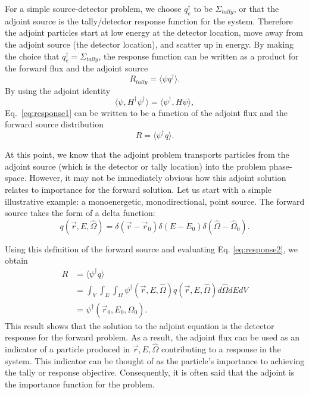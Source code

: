 For a simple source-detector problem, we choose
$q_{e}^{\dagger}$ to be $\Sigma_{tally}$, or that the adjoint source is the
tally/detector response function
for the system. Therefore the adjoint particles start at low energy at the detector
location, move away from the adjoint source (the detector location), and scatter
up in energy.
 By making the choice that $q_{e}^{\dagger} = \Sigma_{tally}$, the
response function can be written as a product for the forward flux and the
adjoint source
\begin{equation}
  R_{tally} = \langle \psi q^{\dagger} \rangle .
  \label{eq:response1}
\end{equation}
By using the adjoint identity 
\begin{equation}
  \langle \psi, H^{\dagger} \psi^{\dagger} \rangle =
  \langle \psi^{\dagger}, H \psi \rangle ,
\end{equation}
Eq.\ \eqref{eq:response1} can be written to be a function of the
adjoint flux and the forward source distribution
\begin{equation}
  R = \langle \psi^{\dagger} q \rangle .
  \label{eq:response2}
\end{equation}

At this point, we know that the adjoint problem transports particles from the adjoint source (which is the detector or tally
location) into the problem phase-space. However, it may not be immediately obvious how this adjoint solution
relates to importance for the forward solution. Let us start with a simple
illustrative example: a monoenergetic, monodirectional, point source. The
forward source takes the form of a delta function:
\begin{equation*}
  q(\vec{r}, E, \hat{\Omega}) = \delta(\vec{r}-\vec{r}_0) \delta(E-E_0)
  \delta(\hat{\Omega}-\hat{\Omega}_0) .
\end{equation*}

Using this definition of the forward source and evaluating Eq.
\eqref{eq:response2}, we obtain
\begin{equation*}
  \begin{split}
    R &= \langle \psi^{\dagger} q \rangle \\
    &= \int_{V} \int_{E} \int_{\Omega} \psi^{\dagger}(\vec{r}, E, \hat{\Omega})
       q(\vec{r}, E, \hat{\Omega}) d\hat\Omega dE dV \\
       & = \psi^{\dagger}(\vec{r}_0, E_0, \hat{\Omega}_0).
\end{split}
\end{equation*}
This result shows that the solution to the adjoint equation is the detector
response for the forward problem. As a result, the adjoint flux can be used as
an indicator of a particle produced in $\vec{r}, E, \hat{\Omega}$ contributing
to a response in the system. This indicator can be thought of as the particle's
importance to achieving the tally or response objective. Consequently, it is
often said that the adjoint is the importance function for the problem.


